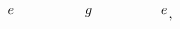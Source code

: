 \begin{equation}
\begin{gathered}
\begin{tikzpicture}[x=0.75pt,y=0.75pt,yscale=-1,xscale=1]
            \draw (118,182.4) node [anchor=north] [inner sep=0.75pt]    {$e$};
            \draw (192,182.4) node [anchor=north] [inner sep=0.75pt]    {$g$};
            \draw (264,182.4) node [anchor=north] [inner sep=0.75pt]    {$e$};
            \end{tikzpicture}
    \end{gathered},
    \label{eq:one-loop}
\end{equation}